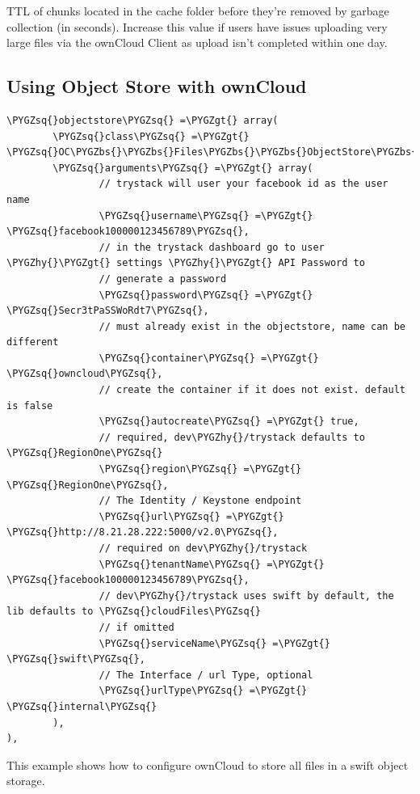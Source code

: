 \documentclass[letterpaper,10pt,english]{sphinxmanual}
\def\PYGZbs{\char`\\}
\def\PYGZgt{\char`\>}
\def\PYGZhy{\char`\-}
\def\PYGZsq{\char`\'}
\renewcommand\PYGZsq{\textquotesingle}
\begin{document}
TTL of chunks located in the cache folder before they're removed by
garbage collection (in seconds). Increase this value if users have
issues uploading very large files via the ownCloud Client as upload isn't
completed within one day.


\subsection{Using Object Store with ownCloud}
\label{configuration_server/config_sample_php_parameters:using-object-store-with-owncloud}
\begin{Verbatim}[commandchars=\\\{\}]
\PYGZsq{}objectstore\PYGZsq{} =\PYGZgt{} array(
        \PYGZsq{}class\PYGZsq{} =\PYGZgt{} \PYGZsq{}OC\PYGZbs{}\PYGZbs{}Files\PYGZbs{}\PYGZbs{}ObjectStore\PYGZbs{}\PYGZbs{}Swift\PYGZsq{},
        \PYGZsq{}arguments\PYGZsq{} =\PYGZgt{} array(
                // trystack will user your facebook id as the user name
                \PYGZsq{}username\PYGZsq{} =\PYGZgt{} \PYGZsq{}facebook100000123456789\PYGZsq{},
                // in the trystack dashboard go to user \PYGZhy{}\PYGZgt{} settings \PYGZhy{}\PYGZgt{} API Password to
                // generate a password
                \PYGZsq{}password\PYGZsq{} =\PYGZgt{} \PYGZsq{}Secr3tPaSSWoRdt7\PYGZsq{},
                // must already exist in the objectstore, name can be different
                \PYGZsq{}container\PYGZsq{} =\PYGZgt{} \PYGZsq{}owncloud\PYGZsq{},
                // create the container if it does not exist. default is false
                \PYGZsq{}autocreate\PYGZsq{} =\PYGZgt{} true,
                // required, dev\PYGZhy{}/trystack defaults to \PYGZsq{}RegionOne\PYGZsq{}
                \PYGZsq{}region\PYGZsq{} =\PYGZgt{} \PYGZsq{}RegionOne\PYGZsq{},
                // The Identity / Keystone endpoint
                \PYGZsq{}url\PYGZsq{} =\PYGZgt{} \PYGZsq{}http://8.21.28.222:5000/v2.0\PYGZsq{},
                // required on dev\PYGZhy{}/trystack
                \PYGZsq{}tenantName\PYGZsq{} =\PYGZgt{} \PYGZsq{}facebook100000123456789\PYGZsq{},
                // dev\PYGZhy{}/trystack uses swift by default, the lib defaults to \PYGZsq{}cloudFiles\PYGZsq{}
                // if omitted
                \PYGZsq{}serviceName\PYGZsq{} =\PYGZgt{} \PYGZsq{}swift\PYGZsq{},
                // The Interface / url Type, optional
                \PYGZsq{}urlType\PYGZsq{} =\PYGZgt{} \PYGZsq{}internal\PYGZsq{}
        ),
),
\end{Verbatim}

This example shows how to configure ownCloud to store all files in a
swift object storage.
\end{document}
